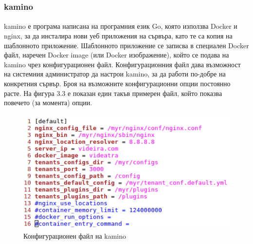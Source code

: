 \documentclass[pdftex,14pt,a4paper]{extreport}
\begin{document}
\subsubsection {kamino}
\paragraph {}
kamino е програма написана на програмния език Go, която използва Docker и nginx, за да инсталира нови уеб приложения на сървъра, като те са копия на шаблонното приложение. Шаблонното приложение се записва в специален Docker файл, наречен Docker image (или Docker изображение), който се подава на kamino чрез конфигурационен файл. Конфигурационния файл дава възможност на системния администратор да настрои kamino, за да работи по-добре на конкретния сървър. Броя на възможните конфигурационни опции постоянно расте. На фигура 3.3 е показан един такъв примерен файл, който показва повечето (за момента) опции. 
\paragraph {}

\begin{figure}[h]
  \centering
  \includegraphics[scale=0.8]{./snippets/config}
  \caption{Конфигурационен файл на kamino}
\end{figure}
\end{document}
